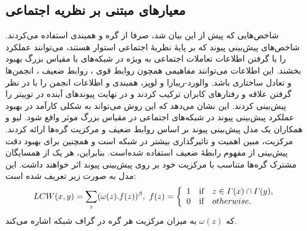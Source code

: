 \subsection{معیارهای مبتنی بر نظریه اجتماعی}
شاخص‌هایی که پیش از این بیان شد، صرفا از گره و همبندی استفاده می‌کردند. شاخص‌های پیش‌بینی پیوند که بر پایهٔ نظریهٔ اجتماعی استوار هستند، می‌توانند عملکرد را با گرفتن اطلاعات تعاملات اجتماعی به ویژه در شبکه‌های با مقیاس بزرگ بهبود بخشند\cite{song2009scalable}. این اطلاعات می‌توانند مفاهیمی همچون روابط قوی ، روابط ضعیف ، انجمن‌ها و تعادل ساختاری باشد.
والورد-ریبازا و لوپز، همبندی و اطلاعات انجمن را با در نظر گرفتن علاقه و رفتارهای کابران ترکیب کردند و در نهایت پیوندهای آینده در توییتر را پیش‌بینی کردند\cite{valverde2013exploiting}. این نشان می‌دهد که این روش می‌تواند به شکلی کارآمد در بهبود عملکرد پیش‌بینی پیوند در شبکه‌های اجتماعی در مقیاس بزرگ موثر واقع شود. 
لیو و همکاران یک مدل پیش‌بینی پیوند بر اساس روابط ضعیف و مرکزیت گره‌ها ارائه کردند. مرکزیت، مبین اهمیت و تاثیرگذاری بیشتر در شبکه است و همچنین برای بهبود دقت پیش‌بینی از مفهوم رابطهٔ ضعیف استفاده شده‌است. بنابراین، هر یک از همسایگان مشترک گره‌ها متناسب با مرکزیت خود بر روی پیش‌بینی پیوند اثر خواهند داشت. این مدل به صورت زیر تعریف شده است:
\begin{equation}
LCW(x,y) = \sum _{z} (\omega (z).f(z))^{\beta}, \\\ f(z)=  \left\{
              \begin{array}{lcl}
                1 & \text{if} &  z \in \varGamma (x) \cap \varGamma (y)  ,\\
                0 & \text{if} & otherwise.
              \end{array} \right.
\end{equation}
که $\omega (z)$ به میزان مرکزیت هر گره در گراف شبکه اشاره می‌کند.

